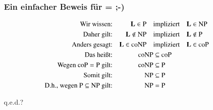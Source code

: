 \documentclass[aspectratio=1610,onlymath]{beamer}
\begin{document}
\begin{frame}\frametitle{Ein einfacher Beweis für  =  ;-)}

\begin{align*}
\text{Wir wissen:}      && \textbf{\textcolor{black}{L}} \in {\textsc{P}} \quad& \text{impliziert}\quad \textbf{\textcolor{black}{L}} \in {\textsc{NP}}  \\
\text{Daher gilt:}  &&          \textbf{\textcolor{black}{L}} \notin {\textsc{NP}} \quad& \text{impliziert}\quad \textbf{\textcolor{black}{L}} \notin {\textsc{P}}\\
\text{Anders gesagt:}  &&   \textbf{\textcolor{black}{L}} \in {\textsc{coNP}} \quad& \text{impliziert}\quad \textbf{\textcolor{black}{L}} \in {\textsc{coP}} \\
\text{Das heißt:} &&       {\textsc{coNP}} &\subseteq  {\textsc{coP}}\\
\text{Wegen ${\textsc{coP}} = {\textsc{P}}$ gilt:}  &&            {\textsc{coNP}} &\subseteq {\textsc{P}}\\
\text{Somit gilt:} &&       {\textsc{NP}} &\subseteq {\textsc{P}}\\
\text{D.h., wegen ${\textsc{P}} \subseteq {\textsc{NP}}$ gilt:} &&       {\textsc{NP}} &= {\textsc{P}}
\end{align*}

\mbox{}\hfill q.e.d.?

\end{frame}


\end{document}
